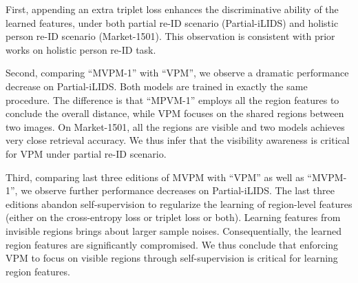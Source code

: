 \documentclass[10pt,twocolumn,letterpaper]{article}
\begin{document}
First, appending an extra triplet loss enhances the discriminative ability of the learned features, under both partial re-ID scenario (Partial-iLIDS) and holistic person re-ID scenario (Market-1501). This observation is consistent with prior works \cite{Hermans2017DefenseTriplet, zhong2018generalizing, zhang2017alignedreid, YuDBZXB18} on holistic person re-ID task.

Second, comparing ``MVPM-1'' with ``VPM'', we observe a dramatic performance decrease on Partial-iLIDS. Both models are trained in exactly the same procedure. The difference is that ``MPVM-1'' employs all the region features to conclude the overall distance, while VPM focuses on the shared regions between two images. On Market-1501, all the regions are visible and two models achieves very close retrieval accuracy. We thus infer that the visibility awareness is critical for VPM under partial re-ID scenario. 

Third, comparing last three editions of MVPM with ``VPM'' as well as ``MVPM-1'', we observe further performance decreases on Partial-iLIDS.  The last three editions abandon self-supervision to regularize the learning of region-level features (either on the cross-entropy loss or triplet loss or both). Learning features from invisible regions brings about larger sample noises. Consequentially, the learned region features are significantly compromised. We thus conclude that enforcing VPM to focus on visible regions through self-supervision is critical for learning region features. 
\end{document}
